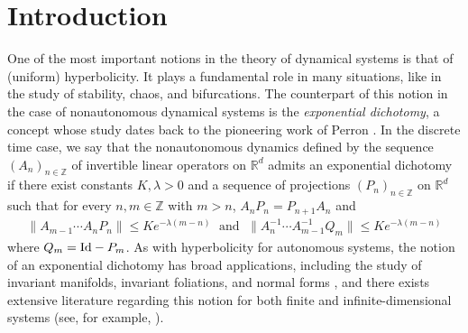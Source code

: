 \documentclass[reqno, a4paper, 10pt]{amsart}
\theoremstyle{plain}
\numberwithin{equation}{section}
\theoremstyle{remark}
\def\R{\mathbb{R}}
\def\Id{\text{\rm Id}}
\def\Z{\mathbb{Z}}
\begin{document}
\maketitle



\section{Introduction} 

One of the most important notions in the theory of dynamical systems is that of (uniform) hyperbolicity. It plays a fundamental role in many situations, like in the study of stability, chaos, and bifurcations. The counterpart of this notion  in the case of nonautonomous dynamical systems is the \emph{exponential dichotomy}, a concept whose study dates back to the pioneering work of Perron \cite{Per-30}. In the discrete time case, we say that the nonautonomous dynamics defined by the sequence $(A_n)_{n\in \Z}$ of invertible linear operators on $\R^d$ admits an exponential dichotomy
if there exist constants ${K},\lambda>0$ and a sequence of projections $(P_n)_{n\in \Z}$ on $\R^d$ such that for every $n,m\in \Z$ with $m>n$, $A_nP_n=P_{n+1}A_n$ and 
\begin{align}\label{ED-00}
\| A_{m-1}\cdots A_n P_n\| \le  {K}e^{-\lambda(m-n)}\;\text{ and }\;
\| A^{-1}_n\cdots A^{-1}_{m-1} Q_m\| \le  {K} e^{-\lambda (m-n)}
\end{align}
where $Q_m=\Id-P_m$.
As with hyperbolicity for autonomous systems, the notion of an exponential dichotomy has broad applications, including the study of invariant manifolds, invariant foliations, and normal forms \cite{BV-book,Pot-book,SY-book}, and there exists extensive literature regarding this notion for both finite and infinite-dimensional systems (see, for example, \cite{CL-JDE95,HZ-JDE04,P-JDE84,ZZ-JFA16}).
\end{document}
